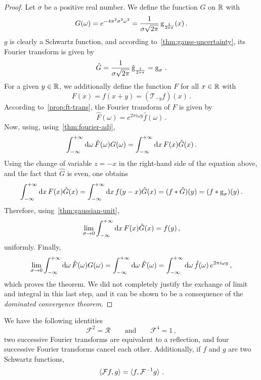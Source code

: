 \begin{proof}
  Let $\sigma$ be a positive real number. We define the function $G$ on $\mathbb{R}$ with
  \begin{equation}
    G(\omega)=e^{-4\pi^2\sigma^2\omega^2}=\frac{1}{\sigma\sqrt{2\pi}}\operatorname{g}_{\frac{1}{2\pi\sigma}}(x)\,.
  \end{equation}
  $g$ is clearly a Schwartz function, and according to~\cref{thm:gauss-uncertainty}, its
  Fourier transform is given by
  \begin{equation}
    \hat{G}=\frac{1}{\sigma\sqrt{2\pi}}\,\hat{\operatorname{g}}_{\frac{1}{2\pi\sigma}}
    =\operatorname{g}_{\sigma}\,.
  \end{equation}
  For a given $y\in\mathbb{R}$, we additionally define the function $F$ for all $x\in\mathbb{R}$ with
  \begin{equation}
    F(x)=f(x+y)=(\mathcal{T}_{-y}f)(x)\,.
  \end{equation}
  According to~\cref{prop:ft-trans}, the Fourier transform of $F$ is given by
  \begin{equation}
    \hat{F}(\omega)=e^{2\pi i\omega y}\hat{f}(\omega)\,.
  \end{equation}
  Now, using, using~\cref{thm:fourier-adj},
  \begin{equation}
    \int_{-\infty}^{+\infty}\mathrm{d}{\omega}\,\hat{F}(\omega)G(\omega)=\int_{-\infty}^{+\infty}\mathrm{d}{x}\,F(x)\hat{G}(x)\,.
  \end{equation}
  Using the change of variable $z=-x$ in the right-hand side of the equation above, and
  the fact that $\hat{G}$ is even, one obtains
  \begin{equation}
    \int_{-\infty}^{+\infty}\mathrm{d}{x}\,F(x)\hat{G}(x)=\int_{-\infty}^{+\infty}\mathrm{d}{x}\,f(y-x)\hat{G}(x)=(f\ast\hat{G})(y)=(f\ast\operatorname{g}_{\sigma})(y)\,.
  \end{equation}
  Therefore, using~\cref{thm:gaussian-unit},
  \begin{equation}
    \lim_{\sigma\to 0}\int_{-\infty}^{+\infty}\mathrm{d}{x}\,F(x)\hat{G}(x)=f(y)\,,
  \end{equation}
  uniformly. Finally,
  \begin{equation}
    \lim_{\sigma\to 0}\int_{-\infty}^{+\infty}\mathrm{d}{\omega}\,\hat{F}(\omega)G(\omega)=
    \int_{-\infty}^{+\infty}\mathrm{d}{\omega}\,\hat{F}(\omega)=\int_{-\infty}^{+\infty}\mathrm{d}{\omega}\,\hat{f}(\omega)\,e^{2\pi i\omega y}\,,
  \end{equation}
  which proves the theorem. We did not completely justify the exchange of limit and
  integral in this last step, and it can be shown to be a consequence of the
  \emph{dominated convergence theorem}.
\end{proof}
\begin{corollary}
  \label{corr:ft-id}
  We have the following identities
  \begin{equation}
    \mathcal{F}^2=\mathcal{R}\qquad\text{and}\qquad\mathcal{F}^4=1\,,
  \end{equation}
  \ie two successive Fourier transforms are equivalent to a reflection, and four
  successive Fourier transforms cancel each other. Additionally, if $f$ and $g$ are two
  Schwartz functions,
  \begin{equation}
    \braket{\mathcal{F}f,g}=\braket{f,\mathcal{F}^{-1}g}\,.
  \end{equation}
\end{corollary}
